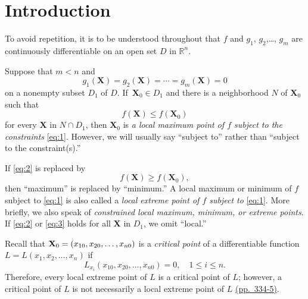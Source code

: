 \documentclass{article}
\begin{document}
\section{Introduction} \label{section:2}
To avoid repetition, it is to be understood  throughout   that
 $f$ and $g_{1}$, $g_{2}$,\dots,
$g_{m}$ are continuously differentiable  on
 an open set $D$ in $\mathbb{R}^{n}$.

Suppose   that $m<n$   and
\begin{equation} \label{eq:1}
g_{1}(\mathbf{X}) = g_2(\mathbf{X}) = \cdots = g_{m}(\mathbf{X})=0
\end{equation}
on a  nonempty subset $D_{1}$ of $D$.
  If\, $\mathbf{X}_{0} \in
D_{1}$ and there is a neighborhood $N$ of $\mathbf{X}_{0}$ such that
\begin{equation} \label{eq:2}
f(\mathbf{X}) \le f(\mathbf{X}_{0})
\end{equation}
for every $\mathbf{X}$ in $N \cap D_{1}$,  then $\mathbf{X}_{0}$
 is \emph{a local
maximum point of $f$ subject to the constraints} \eqref{eq:1}.
However, we will usually say ``subject
to'' rather than ``subject to the constraint(s).''

 If \eqref{eq:2} is replaced
by
\begin{equation} \label{eq:3}
f(\mathbf{X}) \ge f(\mathbf{X}_{0}),
\end{equation}
then ``maximum'' is replaced by ``minimum.''  A local maximum or minimum of
$f$ subject to \eqref{eq:1} is also called a {\it local extreme point of
$f$
subject to} \eqref{eq:1}.  More briefly, we also speak of {\it constrained
local maximum, minimum, or extreme points}.  If \eqref{eq:2} or
\eqref{eq:3} holds for all
$\mathbf{X}$ in $D_{1}$, we omit  ``local.''

Recall that
${\bf X}_{0}=(x_{10}, x_{20},\dots,x_{n0})$
 is a \emph{critical
point} of a differentiable function
$L=L(x_{1},x_{2},\dots,x_{n})$ if
$$
L_{x_{i}}(x_{10},x_{20},\dots,x_{n0})=0,\quad 1\le i\le n.
$$
Therefore, every local extreme point of $L$ is a critical point of $L$;
however, a critical point  of $L$  is not necessarily
a   local extreme point of $L$
\href{http://ramanujan.math.trinity.edu/wtrench/texts/TRENCH_REAL_ANALYSIS.PDF}
{(pp.~334-5)}.
\end{document}
